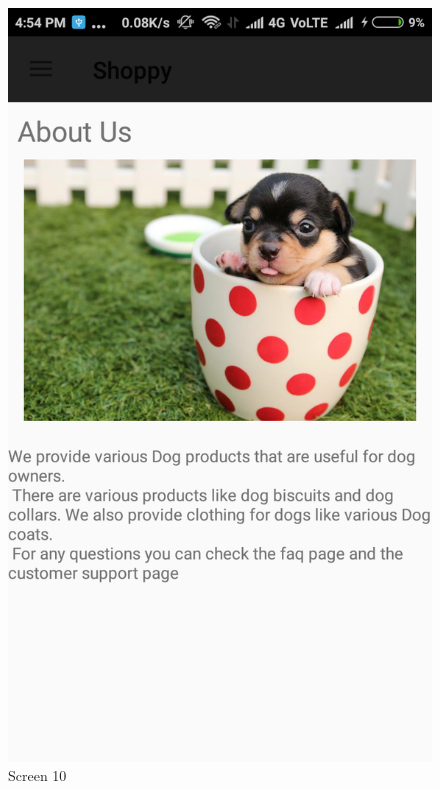\begin{figure}[ht]
\centering
\includegraphics[scale=0.30]{images/12.png}
\caption{Screen 10}
\end{figure}

\newpage

